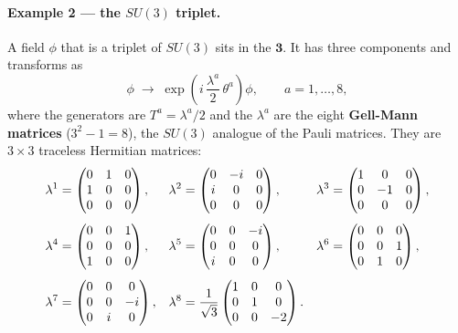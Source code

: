 \documentclass[../main.tex]{subfiles}
\begin{document}
\paragraph{Example 2 --- the $SU(3)$ triplet.}
A field $\phi$ that is a triplet of $SU(3)$ sits in the $\mathbf{3}$. It has three components and transforms as
\begin{equation}
  \phi \;\to\; \exp\!\left(i\,\frac{\lambda^a}{2}\,\theta^a\right)\phi ,
  \qquad a = 1,\dots,8 ,
  \label{eq:lec13:su3triplet}
\end{equation}
where the generators are $T^a = \lambda^a/2$ and the $\lambda^a$ are the eight \textbf{Gell-Mann matrices} ($3^2-1=8$), the $SU(3)$ analogue of the Pauli matrices. They are $3\times3$ traceless Hermitian matrices:
\begin{align}
  \lambda^1 &= \begin{pmatrix}0&1&0\\1&0&0\\0&0&0\end{pmatrix},
  &\lambda^2 &= \begin{pmatrix}0&-i&0\\i&0&0\\0&0&0\end{pmatrix},
  &\lambda^3 &= \begin{pmatrix}1&0&0\\0&-1&0\\0&0&0\end{pmatrix},
  \notag\\[4pt]
  \lambda^4 &= \begin{pmatrix}0&0&1\\0&0&0\\1&0&0\end{pmatrix},
  &\lambda^5 &= \begin{pmatrix}0&0&-i\\0&0&0\\i&0&0\end{pmatrix},
  &\lambda^6 &= \begin{pmatrix}0&0&0\\0&0&1\\0&1&0\end{pmatrix},
  \label{eq:lec13:gellmann}\\[4pt]
  \lambda^7 &= \begin{pmatrix}0&0&0\\0&0&-i\\0&i&0\end{pmatrix},
  &\lambda^8 &= \frac{1}{\sqrt3}\begin{pmatrix}1&0&0\\0&1&0\\0&0&-2\end{pmatrix}.
  & &\notag
\end{align}
\end{document}
